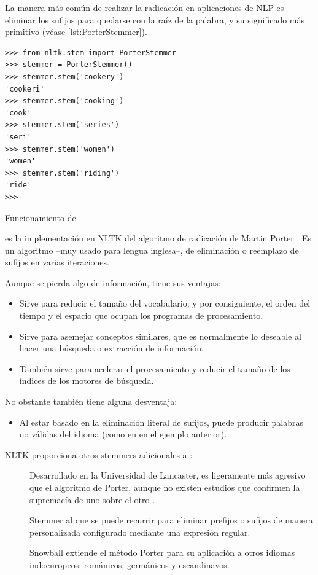 La manera más común de realizar la radicación en aplicaciones de NLP es eliminar los sufijos para quedarse con la raíz de la palabra, y su significado más primitivo (véase \autoref{lst:PorterStemmer}).

\begin{listing}[htbp]
\begin{verbatim}
>>> from nltk.stem import PorterStemmer
>>> stemmer = PorterStemmer()
>>> stemmer.stem('cookery')
'cookeri'
>>> stemmer.stem('cooking')
'cook'
>>> stemmer.stem('series')
'seri'
>>> stemmer.stem('women')
'women'
>>> stemmer.stem('riding')
'ride'
>>> 
\end{verbatim}
\caption{Funcionamiento de }
\label{lst:PorterStemmer}
\end{listing}

 es la implementación en NLTK del algoritmo de radicación de Martin Porter \citep{Porter1980}. Es un algoritmo --muy usado para lengua inglesa--, de eliminación o reemplazo de sufijos en varias iteraciones.

Aunque se pierda algo de información, tiene sus ventajas:
\nopagebreak
\begin{itemize}
\item Sirve para reducir el tamaño del vocabulario; y por consiguiente, el orden del tiempo y el espacio que ocupan los programas de procesamiento.
\item Sirve para asemejar conceptos similares, que es normalmente lo deseable al hacer una búsqueda o extracción de información.
\item También sirve para acelerar el procesamiento y reducir el tamaño de los índices de los motores de búsqueda.
\end{itemize}

No obstante también tiene alguna desventaja:
\nopagebreak
\begin{itemize}
\item Al estar basado en la eliminación literal de sufijos, puede producir palabras no válidas del idioma (como en  en el ejemplo anterior).
\end{itemize}

NLTK proporciona otros stemmers adicionales a :
\begin{description}
\item[] Desarrollado en la Universidad de Lancaster, es ligeramente más agresivo que el algoritmo de Porter, aunque no existen estudios que confirmen la supremacía de uno sobre el otro \citep{Perkins2014}.
\item[] Stemmer al que se puede recurrir para eliminar prefijos o sufijos de manera personalizada configurado mediante una expresión regular.
\item[] Snowball extiende el método Porter para su aplicación a otros idiomas indoeuropeos: románicos, germánicos y escandinavos.
\end{description}


